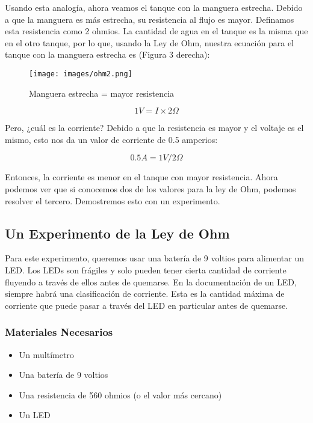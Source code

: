 \documentclass[output=paper, 
colorlinks,
citecolor=brown,
newtxmath
]{langscibook}
\begin{document}
Usando esta analogía, ahora veamos el tanque con la manguera estrecha. Debido a que la manguera es más estrecha, su resistencia al flujo es mayor. Definamos esta resistencia como 2 ohmios. La cantidad de agua en el tanque es la misma que en el otro tanque, por lo que, usando la Ley de Ohm, nuestra ecuación para el tanque con la manguera estrecha es (Figura 3 derecha):

\begin{figure}[H]
\texttt{[image: images/ohm2.png]}
\caption{Manguera estrecha = mayor resistencia}
\label{fig:unidades}
\end{figure}

\[1V = I \times 2Ω\]


Pero, ¿cuál es la corriente? Debido a que la resistencia es mayor y el voltaje es el mismo, esto nos da un valor de corriente de 0.5 amperios:

\[0.5A = 1V / 2Ω\]

Entonces, la corriente es menor en el tanque con mayor resistencia. Ahora podemos ver que si conocemos dos de los valores para la ley de Ohm, podemos resolver el tercero. Demostremos esto con un experimento.

\subsection{Un Experimento de la Ley de Ohm}

Para este experimento, queremos usar una batería de 9 voltios para alimentar un LED. Los LEDs son frágiles y solo pueden tener cierta cantidad de corriente fluyendo a través de ellos antes de quemarse. En la documentación de un LED, siempre habrá una clasificación de corriente. Esta es la cantidad máxima de corriente que puede pasar a través del LED en particular antes de quemarse.

\subsubsection{Materiales Necesarios}

\begin{itemize}
  \setlength\itemsep{-0.5em}
\item Un multímetro
\item Una batería de 9 voltios
\item Una resistencia de 560 ohmios (o el valor más cercano)
\item Un LED
\end{itemize}
\end{document}
